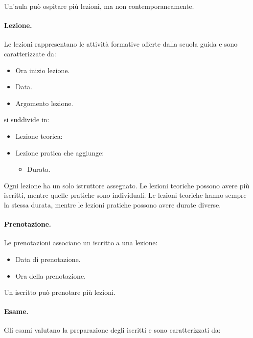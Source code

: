 \documentclass[10pt,twoside]{article}
\begin{document}
{    Un’aula può ospitare più lezioni, ma non contemporaneamente.
    

    \paragraph{Lezione.}
    Le lezioni rappresentano le attività formative offerte dalla scuola guida e sono caratterizzate da: 
    
    \begin{itemize}
        \item Ora inizio lezione.
        \item Data.
        \item Argomento lezione.
    \end{itemize}
    
    si suddivide in:

    \begin{itemize}
        \item Lezione teorica:
        \item Lezione pratica che aggiunge:
        \begin{itemize}
            \item Durata.
        \end{itemize}
    \end{itemize}

    Ogni lezione ha un solo istruttore assegnato. Le lezioni teoriche possono avere più iscritti, mentre quelle pratiche sono individuali. Le lezioni teoriche hanno sempre la stessa durata, mentre le lezioni pratiche possono avere durate diverse.
    

    \paragraph{Prenotazione.}
    Le prenotazioni associano un iscritto a una lezione:

    \begin{itemize}
        \item Data di prenotazione. 
        \item Ora della prenotazione.
    \end{itemize}

    Un iscritto può prenotare più lezioni.
    

    \paragraph{Esame.}
    Gli esami valutano la preparazione degli iscritti e sono caratterizzati da:

}
\end{document}

